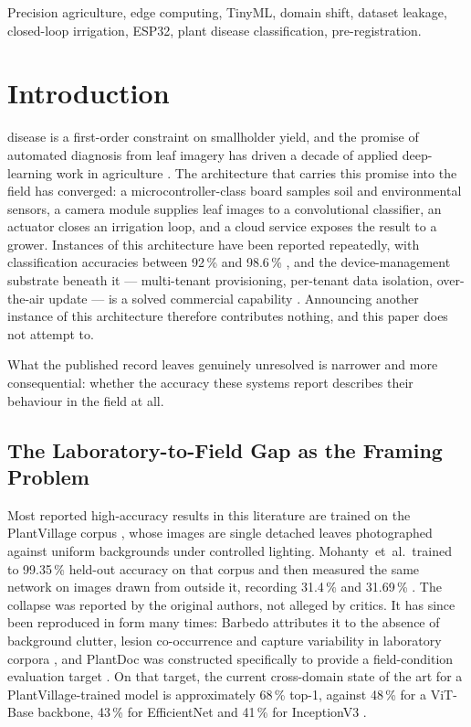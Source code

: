 \documentclass[journal]{IEEEtran}
\begin{document}
\begin{IEEEkeywords}
Precision agriculture, edge computing, TinyML, domain shift, dataset
leakage, closed-loop irrigation, ESP32, plant disease classification,
pre-registration.
\end{IEEEkeywords}

\section{Introduction}
\label{sec:intro}

 disease is a first-order constraint on smallholder
yield, and the promise of automated diagnosis from leaf imagery has driven
a decade of applied deep-learning work in agriculture
\cite{mohanty2016deep,ferentinos2018deep,too2019comparative}. The
architecture that carries this promise into the field has converged: a
microcontroller-class board samples soil and environmental sensors, a
camera module supplies leaf images to a convolutional classifier, an
actuator closes an irrigation loop, and a cloud service exposes the result
to a grower. Instances of this architecture have been reported repeatedly,
with classification accuracies between 92\,\% and 98.6\,\%
\cite{samanta2024leafsense,nyakuri2025aiiot,aqasizade2026tinymlops}, and
the device-management substrate beneath it --- multi-tenant provisioning,
per-tenant data isolation, over-the-air update --- is a solved commercial
capability \cite{thingsboard,openremote}. Announcing another instance of
this architecture therefore contributes nothing, and this paper does not
attempt to.

What the published record leaves genuinely unresolved is narrower and more
consequential: whether the accuracy these systems report describes their
behaviour in the field at all.

\subsection{The Laboratory-to-Field Gap as the Framing Problem}

Most reported high-accuracy results in this literature are trained on the
PlantVillage corpus \cite{hughes2015plantvillage}, whose images are single
detached leaves photographed against uniform backgrounds under controlled
lighting. Mohanty~et~al.\ trained to 99.35\,\% held-out accuracy on that
corpus and then measured the same network on images drawn from outside it,
recording 31.4\,\% and 31.69\,\% \cite{mohanty2016deep}. The collapse was
reported by the original authors, not alleged by critics. It has since been
reproduced in form many times: Barbedo attributes it to the absence of
background clutter, lesion co-occurrence and capture variability in
laboratory corpora \cite{barbedo2018factors,barbedo2019plant}, and PlantDoc
was constructed specifically to provide a field-condition evaluation target
\cite{singh2020plantdoc}. On that target, the current cross-domain state of
the art for a PlantVillage-trained model is approximately 68\,\% top-1,
against 48\,\% for a ViT-Base backbone, 43\,\% for EfficientNet and 41\,\%
for InceptionV3 \cite{salman2025plantdisease}.
\end{document}
